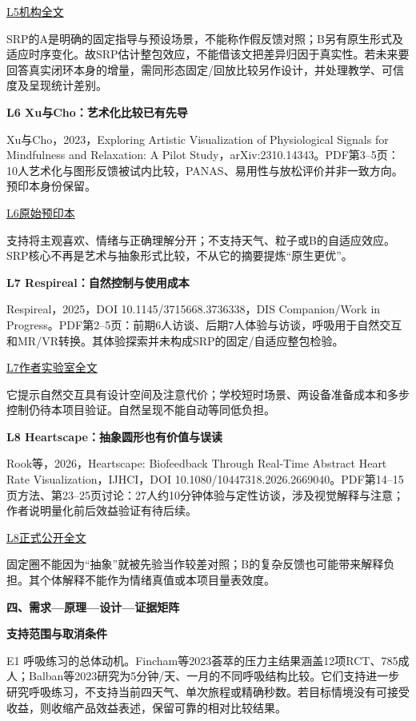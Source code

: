 \documentclass[11pt,a4paper]{article}
\newcommand{\reviewsection}[1]{\par\Needspace{9\baselineskip}\vspace{10pt}\begin{center}{\titlelatin\titlecjk\bfseries\fontsize{14}{20}\selectfont #1}\end{center}}
\newcommand{\reviewsubsection}[1]{\par\Needspace{4\baselineskip}\vspace{4pt}\begin{center}{\titlelatin\titlecjk\bfseries\fontsize{12}{18}\selectfont #1}\end{center}}
\begin{document}
\href{https://air.uniud.it/bitstream/11390/1278804/1/1-s2.0-S1071581924000594-main.pdf}{L5机构全文}


SRP的A是明确的固定指导与预设场景，不能称作假反馈对照；B另有原生形式及适应时序变化。故SRP估计整包效应，不能借该文把差异归因于真实性。若未来要回答真实闭环本身的增量，需同形态固定/\allowbreak{}回放比较另作设计，并处理教学、可信度及呈现统计差别。


\reviewsubsection{3.3 L6 Xu与Cho：艺术化比较已有先导}
Xu与Cho，2023，Exploring Artistic Visualization of Physiological Signals for Mindfulness and Relaxation: A Pilot Study，arXiv:2310.14343。PDF第3–5页：10人艺术化与图形反馈被试内比较，PANAS、易用性与放松评价并非一致方向。预印本身份保留。


\href{https://arxiv.org/abs/2310.14343}{L6原始预印本}


支持将主观喜欢、情绪与正确理解分开；不支持天气、粒子或B的自适应效应。SRP核心不再是艺术与抽象形式比较，不从它的摘要提炼“原生更优”。


\reviewsubsection{3.4 L7 Respireal：自然控制与使用成本}
Respireal，2025，DOI 10.1145/\allowbreak{}3715668.3736338，DIS Companion/\allowbreak{}Work in Progress。PDF第2–5页：前期6人访谈、后期7人体验与访谈，呼吸用于自然交互和MR/\allowbreak{}VR转换。其体验探索并未构成SRP的固定/\allowbreak{}自适应整包检验。


\href{https://exertiongameslab.org/wp-content/uploads/2025/06/respireal_dis2025.pdf}{L7作者实验室全文}


它提示自然交互具有设计空间及注意代价；学校短时场景、两设备准备成本和多步控制仍待本项目验证。自然呈现不能自动等同低负担。


\reviewsubsection{3.5 L8 Heartscape：抽象圆形也有价值与误读}
Rook等，2026，Heartscape: Biofeedback Through Real-\allowbreak{}Time Abstract Heart Rate Visualization，IJHCI，DOI 10.1080/\allowbreak{}10447318.2026.2669040。PDF第14–15页方法、第23–25页讨论：27人约10分钟体验与定性访谈，涉及视觉解释与注意；作者说明量化前后效益验证有待后续。


\href{https://researchportal.northumbria.ac.uk/ws/portalfiles/portal/231316276/Heartscape_Biofeedback_Through_Real-Time_Abstract_Heart_Rate_Visualization.pdf}{L8正式公开全文}


固定圈不能因为“抽象”就被先验当作较差对照；B的复杂反馈也可能带来解释负担。其个体解释不能作为情绪真值或本项目量表效度。


\reviewsection{四、需求—原理—设计—证据矩阵}
\reviewsubsection{4.1 支持范围与取消条件}
E1 呼吸练习的总体动机。Fincham等2023荟萃的压力主结果涵盖12项RCT、785成人；Balban等2023研究为5分钟/\allowbreak{}天、一月的不同呼吸结构比较。它们支持进一步研究呼吸练习，不支持当前四天气、单次旅程或精确秒数。若目标情境没有可接受收益，则收缩产品效益表述，保留可靠的相对比较结果。
\end{document}

